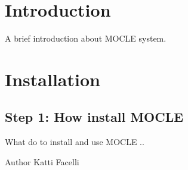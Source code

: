 \hypertarget{index_intro_sec}{}\section{Introduction}\label{index_intro_sec}
A brief introduction about MOCLE system.\hypertarget{index_install_sec}{}\section{Installation}\label{index_install_sec}
\hypertarget{index_step1}{}\subsection{Step 1: How install MOCLE}\label{index_step1}
What do to install and use MOCLE ..

\begin{DoxyAuthor}{Author}
Katti Facelli 
\end{DoxyAuthor}
